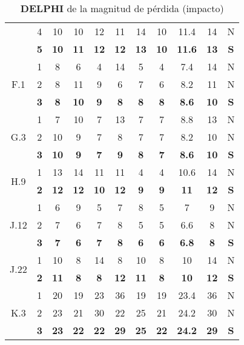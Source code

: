 \documentclass[11pt,a4paper,spanish,twoside]{report}
\begin{document}
\begin{table}[!h]
\begin{tabular}{|c|c||c|c|c|c|c||c|c|c||c|}
    & 4 & 10 & 10 & 12 & 11 & 14 & 10 & 11.4 & 14 & N \\
    & \textbf{5} & \textbf{10} & \textbf{11} & \textbf{12} & \textbf{12} &
    \textbf{13} & \textbf{10} & \textbf{11.6} & \textbf{13} & \textbf{S} \\ 
    \hline
    \multirow{3}{*}{F.1} & 1 & 8 & 6 & 4 & 14 & 5 & 4 & 7.4 & 14 & N \\
    & 2 & 8 & 11 & 9 & 6 & 7 & 6 & 8.2 & 11 & N \\
    & \textbf{3} & \textbf{8} & \textbf{10} & \textbf{9} & \textbf{8} &
    \textbf{8} & \textbf{8} & \textbf{8.6} & \textbf{10} & \textbf{S} \\ 
    \hline
    \multirow{3}{*}{G.3} & 1 & 7 & 10 & 7 & 13 & 7 & 7 & 8.8 & 13 & N \\
    & 2 & 10 & 9 & 7 & 8 & 7 & 7 & 8.2 & 10 & N \\
    & \textbf{3} & \textbf{10} & \textbf{9} & \textbf{7} & \textbf{9} &
    \textbf{8} & \textbf{7} & \textbf{8.6} & \textbf{10} & \textbf{S} \\ 
    \hline
    \multirow{2}{*}{H.9} & 1 & 13 & 14 & 11 & 11 & 4 & 4 & 10.6 & 14 & N \\
    & \textbf{2} & \textbf{12} & \textbf{12} & \textbf{10} & \textbf{12} &
    \textbf{9} & \textbf{9} & \textbf{11} & \textbf{12} & \textbf{S} \\ 
    \hline
    \multirow{3}{*}{J.12} & 1 & 6 & 9 & 5 & 7 & 8 & 5 & 7 & 9 & N \\
    & 2 & 7 & 6 & 7 & 8 & 5 & 5 & 6.6 & 8 & N \\
    & \textbf{3} & \textbf{7} & \textbf{6} & \textbf{7} & \textbf{8} &
    \textbf{6} & \textbf{6} & \textbf{6.8} & \textbf{8} & \textbf{S} \\ 
    \hline
    \multirow{2}{*}{J.22} & 1 & 10 & 8 & 14 & 8 & 10 & 8 & 10 & 14 & N \\
    & \textbf{2} & \textbf{11} & \textbf{8} & \textbf{8} & \textbf{12} &
    \textbf{11} & \textbf{8} & \textbf{10} & \textbf{12} & \textbf{S} \\ 
    \hline
    \multirow{3}{*}{K.3} & 1 & 20 & 19 & 23 & 36 & 19 & 19 & 23.4 & 36 & N \\
    & 2 & 23 & 21 & 30 & 22 & 25 & 21 & 24.2 & 30 & N \\
    & \textbf{3} & \textbf{23} & \textbf{22} & \textbf{22} & \textbf{29} &
    \textbf{25} & \textbf{22} & \textbf{24.2} & \textbf{29} & \textbf{S} \\ 

   \end{tabular}
  \caption{\textbf{DELPHI} de la magnitud de pérdida (impacto)}
  \label{Tab:DELPHImag}
\end{table}
\end{document}
